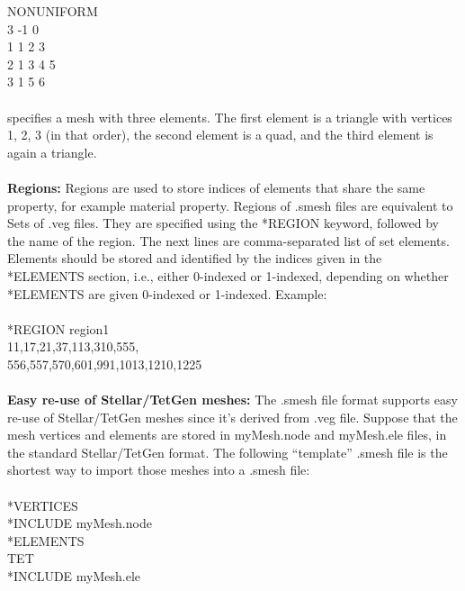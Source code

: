 \documentclass[11pt,fullpage]{article}
\begin{document}
NONUNIFORM\\
3 -1 0\\
1 1 2 3\\
2 1 3 4 5\\
3 1 5 6
\\\\
\noindent{} specifies a mesh with three elements. The first element is
a triangle with vertices 1, 2, 3 (in that order), the second
element is a quad, and the third element is again a triangle.
\\\\
\noindent{}\textbf{Regions:} Regions are used to store indices of elements that share the same property,
for example material property. Regions of .smesh files are equivalent to
Sets of .veg files. They are specified using the *REGION
keyword, followed by the name of the region. The next lines are
comma-separated list of set elements. Elements should be stored and
identified by the indices given in the *ELEMENTS section, i.e., either
0-indexed or 1-indexed, depending on whether *ELEMENTS are given
0-indexed or 1-indexed. Example:
\\\\
\noindent{}*REGION region1\\
\noindent{}11,17,21,37,113,310,555,\\
\noindent{}556,557,570,601,991,1013,1210,1225
\\\\
\noindent{}\textbf{Easy re-use of Stellar/TetGen meshes:} The .smesh file format supports
easy re-use of Stellar/TetGen meshes since it's derived from .veg
file. Suppose that the mesh vertices and elements are stored in
myMesh.node and myMesh.ele files, in the standard Stellar/TetGen
format. The following ``template'' .smesh file is the shortest way to
import those meshes into a .smesh file:
\\\\
\noindent{}*VERTICES\\
*INCLUDE myMesh.node\\
*ELEMENTS\\
TET\\
*INCLUDE myMesh.ele



\end{document}
